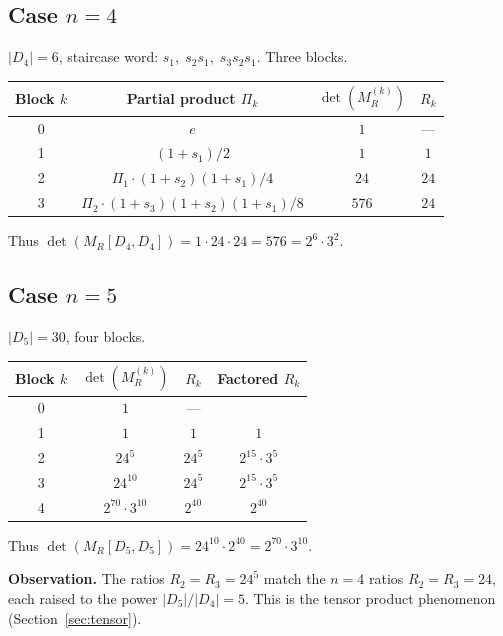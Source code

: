 \documentclass[11pt]{article}
\theoremstyle{definition}
\theoremstyle{remark}
\begin{document}
\subsection{Case $n = 4$}

$|D_4| = 6$, staircase word: $s_1,\; s_2 s_1,\; s_3 s_2 s_1$.
Three blocks.

\begin{center}
\begin{tabular}{cccc}
\toprule
Block $k$ & Partial product $\Pi_k$ & $\det(M_R^{(k)})$ & $R_k$ \\
\midrule
0 & $e$ & $1$ & --- \\
1 & $(1+s_1)/2$ & $1$ & $1$ \\
2 & $\Pi_1 \cdot (1+s_2)(1+s_1)/4$ & $24$ & $24$ \\
3 & $\Pi_2 \cdot (1+s_3)(1+s_2)(1+s_1)/8$ & $576$ & $24$ \\
\bottomrule
\end{tabular}
\end{center}

Thus $\det(M_R[D_4, D_4]) = 1 \cdot 24 \cdot 24 = 576 = 2^6 \cdot 3^2$.

\subsection{Case $n = 5$}

$|D_5| = 30$, four blocks.

\begin{center}
\begin{tabular}{cccc}
\toprule
Block $k$ & $\det(M_R^{(k)})$ & $R_k$ & Factored $R_k$ \\
\midrule
0 & $1$ & --- & \\
1 & $1$ & $1$ & $1$ \\
2 & $24^5$ & $24^5$ & $2^{15} \cdot 3^5$ \\
3 & $24^{10}$ & $24^5$ & $2^{15} \cdot 3^5$ \\
4 & $2^{70} \cdot 3^{10}$ & $2^{40}$ & $2^{40}$ \\
\bottomrule
\end{tabular}
\end{center}

Thus $\det(M_R[D_5, D_5]) = 24^{10} \cdot 2^{40} = 2^{70} \cdot 3^{10}$.

\medskip
\noindent
\textbf{Observation.}  The ratios $R_2 = R_3 = 24^5$ match the $n=4$
ratios $R_2 = R_3 = 24$, each raised to the power $|D_5|/|D_4| = 5$.
This is the tensor product phenomenon (Section~\ref{sec:tensor}).
\end{document}
